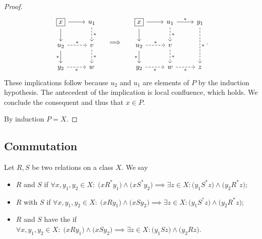 \begin{proof}
\[\begin{tikzcd}
\boxed{x} \rar \dar & u_1 \arrow[d, dashed, "{*}"] \\
u_2 \arrow[d, swap, "{*}"] \arrow[r, dashed, "{*}"] & v \arrow[d, dashed, "{*}"] \\
y_2 \arrow[r, swap, dashed, "{*}"] & w
\end{tikzcd} \quad\implies\quad \begin{tikzcd}
\boxed{x} \rar \dar & u_1 \arrow[r, "{*}"] \arrow[d, dashed, "{*}"] & y_1 \arrow[dd, dashed, "{*}"] \\
u_2 \arrow[d, swap, "{*}"] \arrow[r, dashed, "{*}"] & v \arrow[d, dashed, "{*}"] & {} \\
y_2 \arrow[r, swap, dashed, "{*}"] & w \arrow[r, swap, dashed, "{*}"] & z
\end{tikzcd}. \]
These implications follow because $u_2$ and $u_1$ are elements of $P$ by the induction hypothesis. The antecedent of the implication is local confluence, which holds. We conclude the consequent and thus that $x\in P$.

By induction $P=X$.
\end{proof}

\subsection{Commutation}
\begin{definition}
Let $R,S$ be two relations on a class $X$. We say
\begin{itemize}
\item $R$ and $S$  if $\forall x,y_1,y_2\in X:\; \big(xR^*y_1\big)\land\big(xS^*y_2\big)\implies \exists z\in X: \big(y_1S^*z\big)\land\big(y_2R^*z\big)$;
\item $R$  with $S$ if $\forall x,y_1,y_2\in X:\; \big(xRy_1\big)\land\big(xSy_2\big)\implies \exists z\in X: \big(y_1S^?z\big)\land\big(y_2R^*z\big)$;
\item $R$ and $S$ have the  if $\forall x,y_1,y_2\in X:\; \big(xRy_1\big)\land\big(xSy_2\big)\implies \exists z\in X: \big(y_1Sz\big)\land\big(y_2Rz\big)$.
\end{itemize}
\end{definition}

